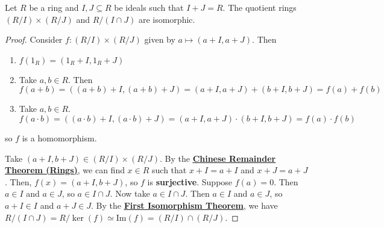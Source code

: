 \documentclass [12pt] {article}
\newenvironment{theorem}[1]{\begin{tcolorbox}[title={Theorem #1},colback=green!5!white,colframe=black!75!green]}{\end{tcolorbox}}
\renewcommand{\href}[2]{\hyperref[#1]{\bf{\underline{{#2}}}}}
\renewcommand{\bf}[1]{\textbf{{#1}}}
\renewcommand{\Im}{\text{Im}}
\begin{document}
\newpage
\begin{theorem}{(Chinese Remainder Theorem (Isomorphism))}
    Let $R$ be a ring and $I, J \subseteq R$ be ideals such that $I + J = R$. The quotient rings
    $(R/I) \times (R/J)$ and $R/(I \cap J)$ are isomorphic.
\end{theorem}
\begin{proof}
    Consider $f : (R/I) \times (R/J)$ given by $a \mapsto (a + I, a + J)$. Then
    \begin{enumerate}[label=(\arabic*)]
        \item $f(1_R) = (1_R + I, 1_R + J)$
        \item Take $a, b \in R$. Then
            \vspace{-0.5em}
            \[
                f(a + b) 
                = ((a + b) + I, (a + b) + J) 
                = (a + I, a + J) + (b + I, b + J) 
                = f(a) + f(b)
            \]
        \item \vspace{-0.5em} Take $a, b \in R$.
            \vspace{-0.5em}
            \[
                f(a \cdot b) 
                = ((a \cdot b) + I, (a \cdot b) + J) 
                = (a + I, a + J) \cdot (b + I, b + J) 
                = f(a) \cdot f(b)
            \]
    \end{enumerate}
    so $f$ is a homomorphism. 
    \vspace{1em}

    Take $(a + I, b + J) \in (R/I) \times (R/J)$. By the
    \href{thm:crtrings}{Chinese Remainder Theorem (Rings)}, we can find $x \in R$ such that
    $x + I = a + I$ and $x + J = a + J$. Then, $f(x) = (a + I, b + J)$, so $f$ is \bf{surjective}.
    Suppose $f(a) = 0$. Then $a \in I$ and $a \in J$, so $a \in I \cap J$. Now take 
    $a \in I \cap J$. Then $a \in I$ and $a \in J$, so $a + I \in I$ and $a + J \in J$. 
    By the \href{thm:isothm}{First Isomorphism Theorem}, we have 
    $R/(I \cap J) = R/\ker(f) \simeq \Im(f) = (R/I) \cap (R/J)$.
\end{proof}
\end{document}
